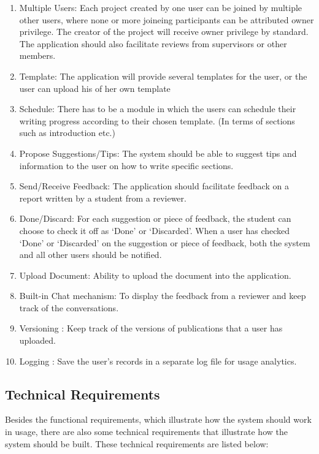 \begin{enumerate}
	\item Multiple Users: Each project created by one user can be joined by multiple other users, where none or more joineing participants can be attributed owner privilege. The creator of the project will receive owner privilege by standard. The application should also facilitate reviews from supervisors or other members.
	\item Template: The application will provide several templates for the user, or the user can upload his of her own template
	\item Schedule: There has to be a module in which the users can schedule their writing progress according to their chosen template. (In terms of sections such as introduction etc.)
	\item Propose Suggestions/Tips: The system should be able to suggest tips and information to the user on how to write specific sections.
	\item Send/Receive Feedback: The application should facilitate feedback on a report written by a student from a reviewer.
	\item Done/Discard: For each suggestion or piece of feedback, the student can choose to check it off as `Done' or `Discarded'. When a user has checked `Done' or `Discarded' on the suggestion or piece of feedback, both the system and all other users should be notified. 
	\item Upload Document: Ability to upload the document into the application.
	\item Built-in Chat mechanism: To display the feedback from a reviewer and keep track of the conversations. 
	\item Versioning : Keep track of the versions of publications that a user has uploaded.
	\item Logging : Save the user's records in a separate log file for usage analytics.
\end{enumerate}

\subsection{Technical Requirements} %
\label{sub:technical_requirements}

Besides the functional requirements, which illustrate how the system should work in usage, there are also some technical requirements that illustrate how the system should be built. These technical requirements are listed below:

